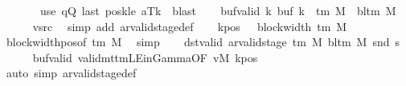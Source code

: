\begin{isabellebody}
\ \ \ \ \ \ \ {\isacharparenleft}{\kern0pt}use\ qQ\ last\ posk{\isacharunderscore}{\kern0pt}le\ aTk\ \ blast{\isacharparenright}{\kern0pt}\isanewline
\ \ \isamarkupfalse%
\ buf{\isacharunderscore}{\kern0pt}valid{\isacharcolon}{\kern0pt}\ {\isachardoublequoteopen}{\isasymforall}k{\isachardot}{\kern0pt}\ buf\ k\ {\isasymin}\ {\isasymGamma}{\isacharunderscore}{\kern0pt}tm\ M\ {\isasymunion}\ {\isacharbraceleft}{\kern0pt}bl{\isacharunderscore}{\kern0pt}tm\ M{\isacharbraceright}{\kern0pt}{\isachardoublequoteclose}\isanewline
\ \ \ \ \isamarkupfalse%
\ vsrc\ \isamarkupfalse%
\ {\isacharparenleft}{\kern0pt}simp\ add{\isacharcolon}{\kern0pt}\ ar{\isacharunderscore}{\kern0pt}valid{\isacharunderscore}{\kern0pt}stage{\isacharunderscore}{\kern0pt}def{\isacharparenright}{\kern0pt}\isanewline
\ \ \isamarkupfalse%
\ kpos{\isacharcolon}{\kern0pt}\ {\isachardoublequoteopen}{}\ {\isacharless}{\kern0pt}\ block{\isacharunderscore}{\kern0pt}width\ {\isacharparenleft}{\kern0pt}{\isasymGamma}{\isacharunderscore}{\kern0pt}tm\ M{\isacharparenright}{\kern0pt}{\isachardoublequoteclose}\ \isamarkupfalse%
\ block{\isacharunderscore}{\kern0pt}width{\isacharunderscore}{\kern0pt}pos{\isacharbrackleft}{\kern0pt}of\ {\isachardoublequoteopen}{\isasymGamma}{\isacharunderscore}{\kern0pt}tm\ M{\isachardoublequoteclose}{\isacharbrackright}{\kern0pt}\ \isamarkupfalse%
\ simp\isanewline
\ \ \isamarkupfalse%
\ dst{\isacharunderscore}{\kern0pt}valid{\isacharcolon}{\kern0pt}\ {\isachardoublequoteopen}ar{\isacharunderscore}{\kern0pt}valid{\isacharunderscore}{\kern0pt}stage\ {\isacharparenleft}{\kern0pt}{\isasymGamma}{\isacharunderscore}{\kern0pt}tm\ M{\isacharparenright}{\kern0pt}\ {\isacharparenleft}{\kern0pt}bl{\isacharunderscore}{\kern0pt}tm\ M{\isacharparenright}{\kern0pt}\ {\isacharparenleft}{\kern0pt}snd\ {\isacharquery}{\kern0pt}s{\isacharprime}{\kern0pt}{\isacharparenright}{\kern0pt}{\isachardoublequoteclose}\isanewline
\ \ \ \ \isamarkupfalse%
\ buf{\isacharunderscore}{\kern0pt}valid\ valid{\isacharunderscore}{\kern0pt}mttm{\isacharunderscore}{\kern0pt}LE{\isacharunderscore}{\kern0pt}in{\isacharunderscore}{\kern0pt}Gamma{\isacharbrackleft}{\kern0pt}OF\ vM{\isacharbrackright}{\kern0pt}\ kpos\isanewline
\ \ \ \ \isamarkupfalse%
\ {\isacharparenleft}{\kern0pt}auto\ simp{\isacharcolon}{\kern0pt}\ ar{\isacharunderscore}{\kern0pt}valid{\isacharunderscore}{\kern0pt}stage{\isacharunderscore}{\kern0pt}def{\isacharparenright}{\kern0pt}\isanewline

\end{isabellebody}
